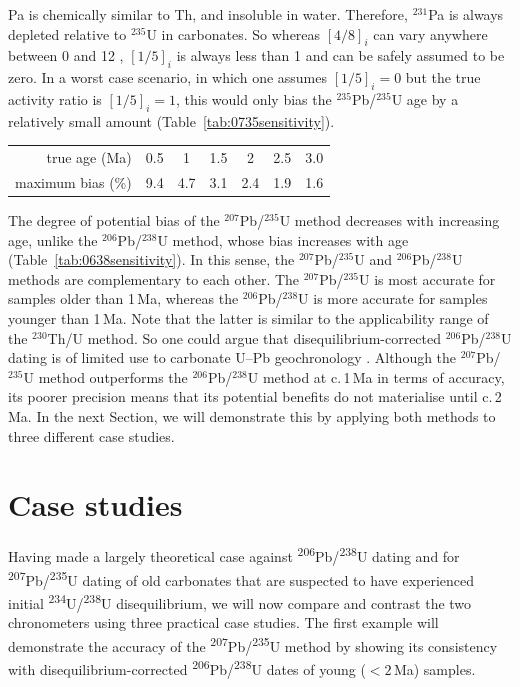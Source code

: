 \documentclass{article}
\begin{document}
Pa is chemically similar to Th, and insoluble in water.  Therefore,
${}^{231}$Pa is always depleted relative to ${}^{235}$U in
carbonates. So whereas $[4/8]_i$ can vary anywhere between 0 and 12
\citep{osmond1976}, $[1/5]_i$ is always less than 1 and can be
safely assumed to be zero. In a worst case scenario, in which one
assumes $[1/5]_i=0$ but the true activity ratio is $[1/5]_i=1$,
this would only bias the ${}^{235}$Pb/${}^{235}$U age by a relatively
small amount (Table~\ref{tab:0735sensitivity}).\medskip

{ \centering {}
  \begin{tabular}{r|cccccc}
    true age (Ma) & 0.5 & 1 & 1.5 & 2 & 2.5 & 3.0 \\
    maximum bias (\%) & 9.4 & 4.7 & 3.1 & 2.4 & 1.9 & 1.6
  \end{tabular}
  \label{tab:0735sensitivity}\medskip
}%

The degree of potential bias of the ${}^{207}$Pb/${}^{235}$U method
decreases with increasing age, unlike the ${}^{206}$Pb/${}^{238}$U
method, whose bias increases with age
(Table~\ref{tab:0638sensitivity}). In this sense, the
${}^{207}$Pb/${}^{235}$U and ${}^{206}$Pb/${}^{238}$U methods are
complementary to each other. The ${}^{207}$Pb/${}^{235}$U is most
accurate for samples older than 1\,Ma, whereas the
${}^{206}$Pb/${}^{238}$U is more accurate for samples younger than
1\,Ma. Note that the latter is similar to the applicability range of
the ${}^{230}$Th/U method. So one could argue that
disequilibrium-corrected ${}^{206}$Pb/${}^{238}$U dating is of limited
use to carbonate U--Pb geochronology \citep[except to infer
  {[4/8]\textsubscript{\it{i}}};][]{engel2019}. Although the
${}^{207}$Pb/${}^{235}$U method outperforms the
${}^{206}$Pb/${}^{238}$U method at c.\,1\,Ma in terms of accuracy, its
poorer precision means that its potential benefits do not materialise
until c.\,2\,Ma. In the next Section, we will demonstrate this by
applying both methods to three different case studies.

\section{Case studies}
\label{sec:accuracy-precision}

Having made a largely theoretical case against
\textsuperscript{206}Pb/\textsuperscript{238}U dating and for
\textsuperscript{207}Pb/\textsuperscript{235}U dating of old
carbonates that are suspected to have experienced initial
\textsuperscript{234}U/\textsuperscript{238}U disequilibrium, we will
now compare and contrast the two chronometers using three practical
case studies.  The first example will demonstrate the accuracy of the
\textsuperscript{207}Pb/\textsuperscript{235}U method by showing its
consistency with disequilibrium-corrected
\textsuperscript{206}Pb/\textsuperscript{238}U dates of young
($<2$\,Ma) samples.\medskip
\end{document}
